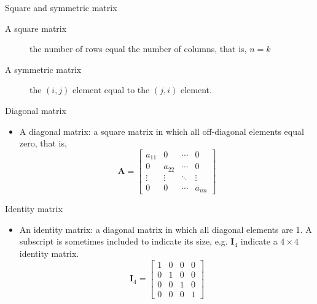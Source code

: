 \documentclass[presentation]{beamer}
\begin{document}
\begin{frame}[label={sec:orgc732244}]{Square and symmetric matrix}
\begin{description}
\item[{A \alert{square} matrix}] the number of rows equal the number
of columns, that is, \(n = k\)

\item[{A \alert{symmetric} matrix}] the \((i,j)\) element equal to the \((j, i)\)
element.
\end{description}
\end{frame}

\begin{frame}[label={sec:org01a7621}]{Diagonal matrix}
\begin{itemize}
\item A \alert{diagonal} matrix: a square matrix in which all off-diagonal
elements equal zero, that is, 
\begin{equation*}  
\mathbf{A} = 
\begin{bmatrix}
a_{11} & 0 & \cdots & 0 \\
0 & a_{22} & \cdots & 0 \\
\vdots & \vdots & \ddots & \vdots \\
0 & 0 & \cdots & a_{nn}
\end{bmatrix}
\end{equation*}
\end{itemize}
\end{frame}

\begin{frame}[label={sec:org4988a8d}]{Identity matrix}
\begin{itemize}
\item An \alert{identity} matrix: a diagonal matrix in which all diagonal
elements are 1. A subscript is sometimes included to indicate its
size, e.g. \(\mathbf{I}_4\) indicate a \(4 \times 4\) identity matrix.
\begin{equation*}
\mathbf{I}_4 = 
\begin{bmatrix}
1 & 0 & 0 & 0 \\
0 & 1 & 0 & 0 \\
0 & 0 & 1 & 0 \\
0 & 0 & 0 & 1
\end{bmatrix}
\end{equation*}
\end{itemize}
\end{frame}
\end{document}
